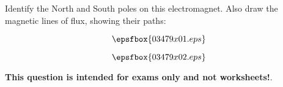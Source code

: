 

Identify the North and South poles on this electromagnet.  Also draw the magnetic lines of flux, showing their paths:

\vskip 20pt

$$\epsfbox{03479x01.eps}$$







$$\epsfbox{03479x02.eps}$$







{\bf This question is intended for exams only and not worksheets!}.



